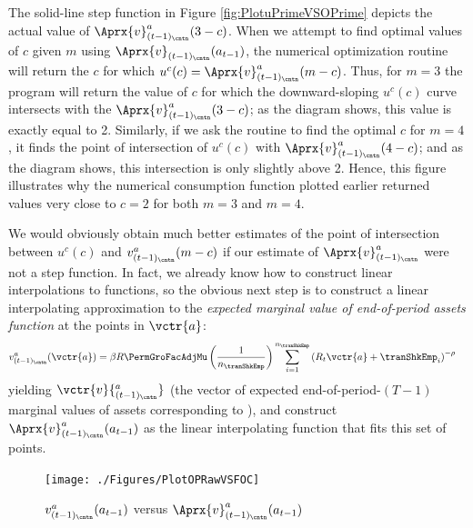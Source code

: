 \documentclass[titlepage, headings=optiontotocandhead]{econtex}
\begin{document}
The solid-line step function in Figure \ref{fig:PlotuPrimeVSOPrime} depicts the actual value of
$\Aprx{v}_{(t-1)_\cntn}^{a}(3-c)$.  When we attempt to find optimal values of
$c$ given $m$ using $\Aprx{v}_{(t-1)_\cntn}(a_{t-1})$, the numerical optimization routine will
return the $c$ for which
$u^{c}(c) = \Aprx{v}^{a}_{(t-1)_\cntn}(m-c)$.  Thus, for
$m=3$ the program will return the value of $c$ for which the downward-sloping
$u^{c}(c)$ curve intersects with the
$\Aprx{v}_{(t-1)_\cntn}^{a}(3-c)$; as the diagram shows, this value is exactly equal to 2.
Similarly, if we ask the routine to find the optimal $c$ for $m=4$, it finds the point of
intersection of $u^{c}(c)$ with $\Aprx{v}_{(t-1)_\cntn}^{a}(4-c)$; and as the diagram shows, this
intersection is only slightly above 2.  Hence, this figure illustrates why the numerical consumption
function plotted earlier returned values very close to $c=2$ for both $m=3$ and $m=4$.

We would obviously obtain much better estimates of the point of intersection between $u^{c}(c)$ and $v_{(t-1)_\cntn}^{a}(m-c)$ if our estimate of $\Aprx{v}^{a}_{(t-1)_\cntn}$ were not a step function.  In fact, we already know how to construct linear interpolations to functions, so the obvious next step is to construct a linear interpolating approximation to the \textit{expected marginal value of end-of-period assets function} at the points in $\vctr{a}$:
\begin{equation}\begin{gathered}\begin{aligned}
      v_{(t-1)_\cntn}^{a}(\vctr{a})  & =  \beta R \PermGroFacAdjMu \left(\frac{1}{n_{\tranShkEmp}}\right) \sum_{i=1}^{n_{\tranShkEmp}} \left(R_{t} \vctr{a} + \tranShkEmp_{i}\right)^{-\rho} \label{eq:vEndPrimeTm1}
    \end{aligned}\end{gathered}\end{equation}
yielding $\vctr{v}{^{a}_{(t-1)_\cntn}}$ (the vector of expected end-of-period-$(T-1)$ marginal values of assets corresponding to ),  %
and construct
$\Aprx{v}_{(t-1)_\cntn}^{a}(a_{t-1})$ as the linear
interpolating function that fits this set of points.

\hypertarget{PlotOPRawVSFOC}{}
\begin{figure}
  \centerline{\texttt{[image: ./Figures/PlotOPRawVSFOC]}}
  \caption{$v_{(t-1)_\cntn}^{a}(a_{t-1})$ versus $\Aprx{v}_{(t-1)_\cntn}^{a}(a_{t-1})$}
  \label{fig:PlotOPRawVSFOC}
\end{figure}
\end{document}
